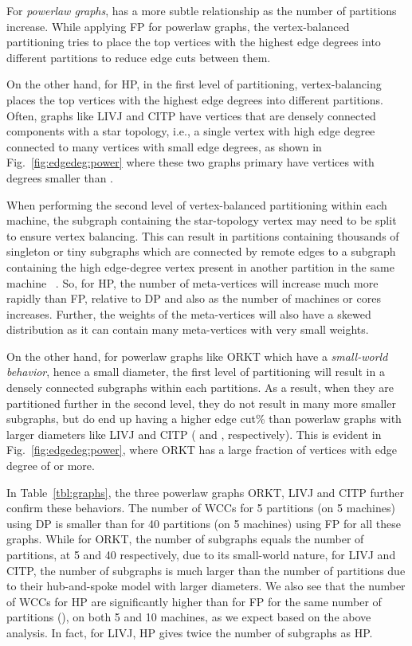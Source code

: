 \documentclass[10pt,conference, compsocconf]{IEEEtran}
\begin{document}
For \emph{powerlaw graphs},  has a more subtle relationship as the number of partitions increase.
While applying FP for powerlaw graphs, the vertex-balanced partitioning tries to place the top  vertices with the highest edge degrees into different partitions to reduce edge cuts between them. 

On the other hand, for HP, in the first level of partitioning, vertex-balancing places the top  vertices with the highest edge degrees into  different partitions. Often, graphs like LIVJ and CITP have vertices that are densely connected components with a star topology, i.e., a single vertex with high edge degree connected to many vertices with small edge degrees, as shown in Fig.~\ref{fig:edgedeg:power} where these two graphs primary have vertices with degrees smaller than . 

When performing the second level of vertex-balanced partitioning within each machine, the subgraph containing the star-topology vertex may need to be split to ensure vertex balancing.  This can result in partitions containing thousands of singleton or tiny subgraphs which are connected by remote edges to a subgraph containing the high edge-degree vertex present in another partition in the same machine ~\cite{lim2015discovering}. So, for HP, the number of meta-vertices  will increase much more rapidly than FP, relative to DP and also as the number of machines or cores increases. Further, the weights of the meta-vertices will also have a skewed distribution as it can contain many meta-vertices with very small weights.

On the other hand, for powerlaw graphs like ORKT which have a \emph{small-world behavior}, hence a small diameter, the first level of partitioning will result in a densely connected subgraphs within each partitions. As a result, when they are partitioned further in the second level, they do not result in many more smaller subgraphs, but do end up having a higher edge cut\% than powerlaw graphs with larger diameters like LIVJ and CITP  ( and , respectively). This is evident in Fig.~\ref{fig:edgedeg:power}, where ORKT has a large fraction of vertices with edge degree of  or more.



In Table~\ref{tbl:graphs}, the three powerlaw graphs ORKT, LIVJ and CITP further confirm these behaviors. The number of WCCs for 5 partitions (on 5 machines) using DP is smaller than for 40 partitions (on 5 machines) using FP for all these graphs. While for ORKT, the number of subgraphs equals the number of partitions, at 5 and 40 respectively, due to its small-world nature, for LIVJ and CITP, the number of subgraphs is much larger than the number of partitions due to their hub-and-spoke model with larger diameters. We also see that the number of WCCs for HP are significantly higher than for FP for the same number of partitions (), on both 5 and 10 machines, as we expect based on the above analysis. In fact, for LIVJ, HP gives twice the number of subgraphs as HP. 
\end{document}
